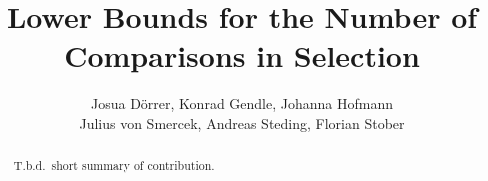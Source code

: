 \documentclass[twoside,leqno,twocolumn]{article}
\begin{document}
%
\newcommand\relatedversion{}



\title{\Large Lower Bounds for the Number of Comparisons in Selection\relatedversion}

\author{Josua Dörrer, Konrad Gendle, Johanna Hofmann \\ Julius von Smercek, Andreas Steding, Florian Stober}

\date{}

\maketitle







\begin{abstract} \small\baselineskip=9pt
  T.b.d.\ short summary of contribution.

\end{abstract} %
\end{document}
